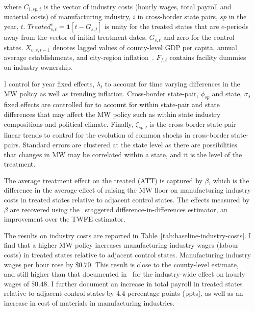 \documentclass[numsec,webpdf,contemporary,large,namedate]{oup-authoring-template}%
\begin{document}
    where $C_{i,sp,t}$ is the vector of industry costs (hourly wages, total payroll and material costs) of manufacturing industry, $i$ in cross-border state pairs, $sp$ in the year, $t$. $Treated_{s,t}^e = \textbf{1}[t - G_{s,t}]$ is unity for the treated states that are $e$-periods away from the vector of initial treatment dates, $G_{s,t}$ and zero for the control states. $X_{v,s,t-1}$ denotes lagged values of county-level GDP per capita, annual average establishments, and city-region inflation~\citep{gopalan2021state, dube2010minimum, clemens2019making}. $F_{f,t}$ contains facility dummies on industry ownership.

    I control for year fixed effects, $\lambda_{t}$ to account for time varying differences in the MW policy as well as trending inflation. Cross-border state-pair, $\phi_{sp}$ and state, $\sigma_{s}$ fixed effects are controlled for to account for within state-pair and state differences that may affect the MW policy such as within state industry compositions and political climate. Finally, $\zeta_{sp,t}$ is the cross-border state-pair linear trends to control for the evolution of common shocks in cross-border state-pairs. Standard errors are clustered at the state level as there are possibilities that changes in MW may be correlated within a state, and it is the level of the treatment.
    

    The average treatment effect on the treated (ATT) is captured by $\beta$, which is the difference in the average effect of raising the MW floor on manufacturing industry costs in treated states relative to adjacent control states. The effects measured by $\beta$ are recovered using the~\citet{sun2021estimating} staggered difference-in-differences estimator, an improvement over the TWFE estimator.

    The results on industry costs are reported in Table~\ref{tab:baseline-industry-costs}. I find that a higher MW policy increases manufacturing industry wages (labour costs) in treated states relative to adjacent control states. Manufacturing industry wages per hour rose by $\$0.70$. This result is close to the county-level estimate, and still higher than that documented in~\citet{gopalan2021state} for the industry-wide effect on hourly wages of $\$0.48$. I further document an increase in total payroll in treated states relative to adjacent control states by $4.4$ percentage points (ppts), as well as an increase in cost of materials in manufacturing industries.
\end{document}
